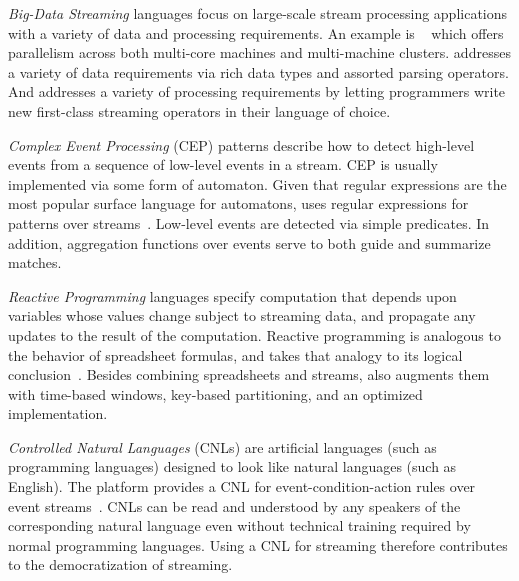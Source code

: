 \emph{Big-Data Streaming} languages focus on large-scale stream
processing applications with a variety of data and processing
requirements. An example is ~\cite{hirzel_schneider_gedik_2017} which offers parallelism across both multi-core machines and
multi-machine clusters.  addresses a variety of data requirements
via rich data types and assorted parsing operators. And  addresses
a variety of processing requirements by letting programmers write new
first-class streaming operators in their language of choice.

\emph{Complex Event Processing} (CEP) patterns describe how to detect
high-level events from a sequence of low-level events in a
stream. CEP is usually implemented via some form of automaton. Given
that regular expressions are the most popular surface language for
automatons,  uses regular expressions for patterns over
streams~\cite{hirzel_2012}. Low-level events are detected via simple
predicates. In addition, aggregation functions over events serve to
both guide and summarize matches.

\emph{Reactive Programming} languages specify computation that depends
upon variables whose values change subject to streaming data, and
propagate any updates to the result of the computation. Reactive
programming is analogous to the behavior of spreadsheet formulas, and
 takes that analogy to its logical
conclusion~\cite{hirzel_et_al_2016}. Besides combining spreadsheets
and streams,  also augments them with time-based windows,
key-based partitioning, and an optimized implementation.

\emph{Controlled Natural Languages} (CNLs) are artificial languages
(such as programming languages) designed to look like natural
languages (such as English).  The  platform provides a CNL for
event-condition-action rules over event
streams~\cite{arnold_et_al_2016}. CNLs can be read and understood by
any speakers of the corresponding natural language even without
technical training required by normal programming languages. Using a
CNL for streaming therefore contributes to the democratization of
streaming.
\fi
